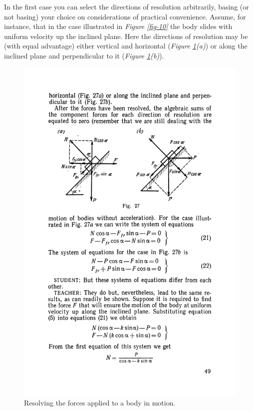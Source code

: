 \documentclass[a4paper,sfsidenotes]{tufte-book}
\begin{document}
In the first case you can select the directions of resolution arbitrarily, basing (or not basing) your choice on considerations of practical convenience. Assume, for instance, that in the case illustrated in \emph{Figure \ref{fig-10}} the body slides with uniform velocity up the inclined plane. Here the directions of resolution may be (with equal advantage) either vertical and horizontal (\emph{Figure \ref{fig-27}(a)}) or along the inclined plane and perpendicular to it (\emph{Figure \ref{fig-27}(b)}).
\\
\begin{figure}
\centering
\includegraphics[width=\linewidth]{fig-027a.pdf}
\caption{Resolving the forces applied to a body in motion. }
\label{fig-27}
\end{figure}
\end{document}
